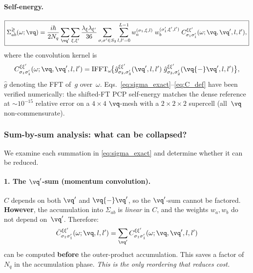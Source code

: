 \paragraph{Self-energy.}
\begin{equation}\label{eq:sigma_exact}
  \boxed{
  \Sigma^{\gtrless}_{ab}(\omega;\vq)
  = \frac{i\hbar}{2N_q}
    \sum_{\vq'}
    \sum_{\xi,\xi'}
    \frac{\lambda_\xi\lambda_{\xi'}}{36}
    \sum_{\sigma,\sigma'\in S_3}
    \sum_{l,l'=0}^{L-1}
    w_a^{(\sigma_1,\xi,l)}\;
    w_b^{(\sigma'_1,\xi',l')}\;
    C_{\sigma_1\sigma'_1}^{\xi\xi'}(\omega;\vq,\vq',l,l'),
  }
\end{equation}
where the convolution kernel is
\begin{equation}\label{eq:C_def}
  C_{\sigma_1\sigma'_1}^{\xi\xi'}(\omega;\vq,\vq',l,l')
  = \mathrm{IFFT}_\omega\!\bigl\{
      \hat{g}_{\sigma_2,\sigma'_3}^{\xi\xi'}(\vq',l,l')
      \;\hat{g}_{\sigma_3,\sigma'_2}^{\xi\xi'}(\vq{-}\vq',l,l')
    \bigr\},
\end{equation}
$\hat{g}$ denoting the FFT of~$g$ over~$\omega$.
Eqs.~\eqref{eq:sigma_exact}--\eqref{eq:C_def} have been
verified numerically: the shifted-FT PCP self-energy matches the
dense reference at $\sim 10^{-15}$ relative error on a $4\times 4$
$\vq$-mesh with a $2\times 2\times 2$ supercell (all~$\vq$ non-commensurate).


\subsubsection{Sum-by-sum analysis: what can be collapsed?}
\label{sssub:sums}

We examine each summation in \cref{eq:sigma_exact} and determine
whether it can be reduced.


\paragraph{1. The $\vq'$-sum (momentum convolution).}
$C$ depends on both $\vq'$ and $\vq{-}\vq'$, so the
$\vq'$-sum cannot be factored.
\textbf{However}, the accumulation into $\Sigma_{ab}$ is \emph{linear}
in $C$, and the weights $w_a, w_b$ do not depend on~$\vq'$.
Therefore:
\begin{equation}\label{eq:qprime_sum_first}
  \bar{C}^{\xi\xi'}_{\sigma_1\sigma'_1}(\omega;\vq,l,l')
  = \sum_{\vq'} C^{\xi\xi'}_{\sigma_1\sigma'_1}(\omega;\vq,\vq',l,l')
\end{equation}
can be computed \textbf{before} the outer-product accumulation.
This saves a factor of~$N_q$ in the accumulation phase.
\emph{This is the only reordering that reduces cost.}


